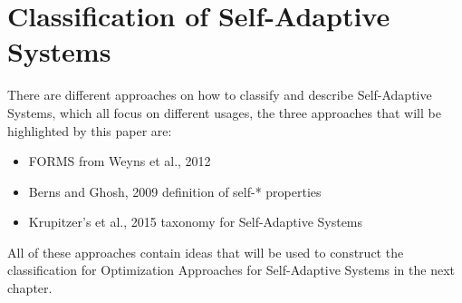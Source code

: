 \newpage
\section{Classification of Self-Adaptive Systems}
\label{ch:SASClassification}




There are different approaches on how to classify and describe Self-Adaptive Systems,
which all focus on different usages, the three approaches that will be highlighted by this paper are:
\begin{itemize}
    \item FORMS from Weyns et al., 2012 \cite*{FORMS}
    \item Berns and Ghosh, 2009 definition of self-* properties \cite*{DissectingSelfProperties}
    \item Krupitzer's et al., 2015 taxonomy for Self-Adaptive Systems \cite*{SurveyOnEngineeringApproaches}
\end{itemize} 
All of these approaches contain ideas that will be used to construct the classification for
Optimization Approaches for Self-Adaptive Systems in the next chapter.
\newline
\par

